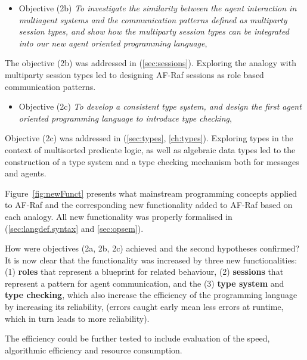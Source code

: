 \documentclass[a4paper,12pt,oneside,fleqn]{book} %
\begin{document}
{\begin{itemize}
\item Objective (2b) \textit{To investigate the similarity between
    the agent interaction in multiagent systems and the communication
    patterns defined as multiparty session types, and show how the
    multiparty session types can be integrated into our new agent oriented
  programming language},
\end{itemize}
  
The objective (2b) was addressed in (\autoref{sec:sessions}). Exploring
the analogy with multiparty session types led to designing AF-Raf sessions
as role based communication patterns.

\begin{itemize}
\item Objective (2c) \textit{To develop a consistent type system,
    and design the first agent oriented programming language to introduce
  type checking}, 
  
\end{itemize}
Objective (2c) was addressed in (\autoref{sec:types}, \autoref{ch:types}).
Exploring types in the context of multisorted predicate logic, as well as
algebraic data types led to the construction of a type system and a type
checking mechanism both for messages and agents.

Figure~\ref{fig:newFunct} presents what mainstream programming concepts
applied to AF-Raf and the corresponding new functionality added to AF-Raf
based on each analogy. All new functionality was properly formalised in
(\autoref{sec:langdef.syntax} and \autoref{sec:opsem}).

How were objectives (2a, 2b, 2c) achieved and the second hypotheses
confirmed? It is now clear that the functionality was increased by three
new functionalities: (1) \textbf{roles} that represent a blueprint for
related behaviour, (2) \textbf{sessions} that represent a pattern for agent
communication, and the (3) \textbf{type system} and \textbf{type checking},
which also increase the efficiency of the programming language by
increasing its reliability, (errors caught early mean less errors at
runtime, which in turn leads to more reliability).

The efficiency could be further tested to include evaluation of the speed,
algorithmic efficiency and resource consumption.

}
\end{document}
